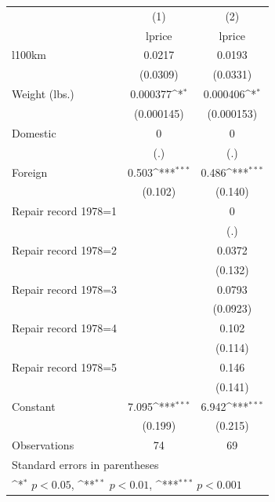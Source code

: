 {
\def\sym#1{\ifmmode^{#1}\else\(^{#1}\)\fi}
\begin{tabular}{l*{2}{c}}
\toprule
                    &\multicolumn{1}{c}{(1)}&\multicolumn{1}{c}{(2)}\\
                    &\multicolumn{1}{c}{lprice}&\multicolumn{1}{c}{lprice}\\
\midrule
l100km              &      0.0217         &      0.0193         \\
                    &    (0.0309)         &    (0.0331)         \\
\addlinespace
Weight (lbs.)       &    0.000377\sym{*}  &    0.000406\sym{*}  \\
                    &  (0.000145)         &  (0.000153)         \\
\addlinespace
Domestic            &           0         &           0         \\
                    &         (.)         &         (.)         \\
\addlinespace
Foreign             &       0.503\sym{***}&       0.486\sym{***}\\
                    &     (0.102)         &     (0.140)         \\
\addlinespace
Repair record 1978=1&                     &           0         \\
                    &                     &         (.)         \\
\addlinespace
Repair record 1978=2&                     &      0.0372         \\
                    &                     &     (0.132)         \\
\addlinespace
Repair record 1978=3&                     &      0.0793         \\
                    &                     &    (0.0923)         \\
\addlinespace
Repair record 1978=4&                     &       0.102         \\
                    &                     &     (0.114)         \\
\addlinespace
Repair record 1978=5&                     &       0.146         \\
                    &                     &     (0.141)         \\
\addlinespace
Constant            &       7.095\sym{***}&       6.942\sym{***}\\
                    &     (0.199)         &     (0.215)         \\
\midrule
Observations        &          74         &          69         \\
\bottomrule
\multicolumn{3}{l}{\footnotesize Standard errors in parentheses}\\
\multicolumn{3}{l}{\footnotesize \sym{*} \(p<0.05\), \sym{**} \(p<0.01\), \sym{***} \(p<0.001\)}\\
\end{tabular}
}
